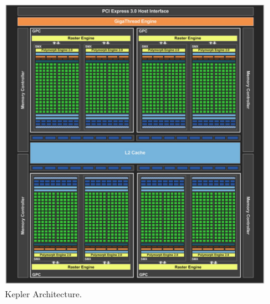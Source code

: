 \begin{figure} [H]
    \centering
    \vspace{0.5in}
    \includegraphics[scale=0.40]{Images/KeplerArch}
    \vspace{0.5in}
    \caption{Kepler Architecture.}
    \label{fig:KeplerArch}
\end{figure}

